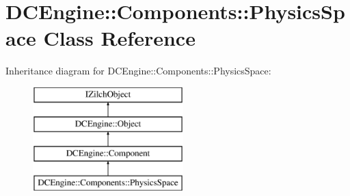 \hypertarget{classDCEngine_1_1Components_1_1PhysicsSpace}{\section{D\-C\-Engine\-:\-:Components\-:\-:Physics\-Space Class Reference}
\label{classDCEngine_1_1Components_1_1PhysicsSpace}
}
Inheritance diagram for D\-C\-Engine\-:\-:Components\-:\-:Physics\-Space\-:\begin{figure}[H]
\begin{center}
\leavevmode
\includegraphics[height=4.000000cm]{classDCEngine_1_1Components_1_1PhysicsSpace}
\end{center}
\end{figure}
